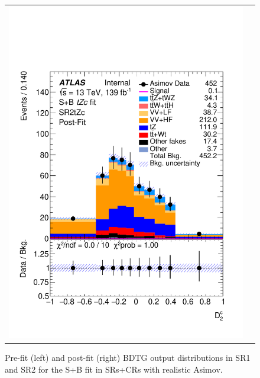 \begin{figure}[htbp]
\begin{tabular}{cc}
		\includegraphics[width=.45\textwidth]{Chapters/CH8/figures/SPLUSB_CRSR_UsingDL1rcFullSys/Plots/SR2_postFit} \\
	\end{tabular}
	\caption{Pre-fit (left) and post-fit (right) BDTG output distributions in SR1 and SR2 for the S+B \tZc fit in SRs+CRs with realistic Asimov.
		\ErrStatSys
	}%
	\label{fig:stat:tzc:splusb:crsr:srplots:1}
\end{figure}

